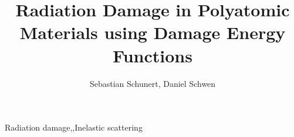 \documentclass[review]{elsarticle}
\begin{document}
\begin{frontmatter}

\title{Radiation Damage in Polyatomic Materials using Damage Energy Functions}

\author{Sebastian Schunert, Daniel Schwen}
\address{Fuels Modeling and Simulation Department, Idaho National Laboratory, P.O Box 1625, Idaho Falls, ID 83415}




\begin{abstract}

\end{abstract}

\begin{keyword}
Radiation damage\sep  \sep Inelastic scattering
\end{keyword}

\end{frontmatter}

\linenumbers
\end{document}
